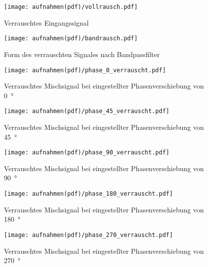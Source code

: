 \begin{figure}
\centering
\label{fig:vollrausch}
\texttt{[image: aufnahmen(pdf)/vollrausch.pdf]}
\caption{Verrauschtes Eingangssignal}
\end{figure}
\begin{figure}
\centering
\label{fig:bandrausch}
\texttt{[image: aufnahmen(pdf)/bandrausch.pdf]}
\caption{Form des verrauschten Signales nach Bandpassfilter}
\end{figure}
\begin{figure}
\centering
\label{fig:phase_0_verrauscht}
\texttt{[image: aufnahmen(pdf)/phase\_0\_verrauscht.pdf]}
\caption{Verrauschtes Mischsignal bei eingestellter Phasenverschiebung von \SI{0}{\degree}}
\end{figure}
\begin{figure}
\centering
\label{fig:phase_45_verrauscht}
\texttt{[image: aufnahmen(pdf)/phase\_45\_verrauscht.pdf]}
\caption{Verrauschtes Mischsignal bei eingestellter Phasenverschiebung von \SI{45}{\degree}}
\end{figure}
\begin{figure}
\centering
\label{fig:phase_90_verrauscht}
\texttt{[image: aufnahmen(pdf)/phase\_90\_verrauscht.pdf]}
\caption{Verrauschtes Mischsignal bei eingestellter Phasenverschiebung von \SI{90}{\degree}}
\end{figure}
\begin{figure}
\centering
\label{fig:phase_180_verrauscht}
\texttt{[image: aufnahmen(pdf)/phase\_180\_verrauscht.pdf]}
\caption{Verrauschtes Mischsignal bei eingestellter Phasenverschiebung von \SI{180}{\degree}}
\end{figure}
\begin{figure}
\centering
\label{fig:phase_270_verrauscht}
\texttt{[image: aufnahmen(pdf)/phase\_270\_verrauscht.pdf]}
\caption{Verrauschtes Mischsignal bei eingestellter Phasenverschiebung von \SI{270}{\degree}}
\end{figure}

